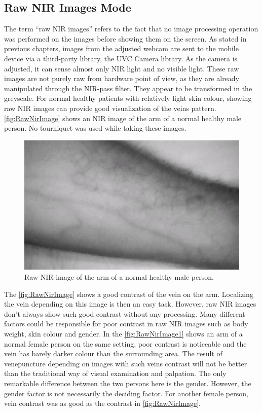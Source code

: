 \subsection{Raw NIR Images Mode}

The term “raw NIR images” refers to the fact that no image processing operation was performed on the images before showing them on the screen. As stated in previous chapters, images from the adjusted webcam are sent to the mobile device via a third-party library, the UVC Camera library. As the camera is adjusted, it can sense almost only NIR light and no visible light. These raw images are not purely raw from hardware point of view, as they are already manipulated through the NIR-pass filter. They appear to be transformed in the greyscale. For normal healthy patients with relatively light skin colour, showing raw NIR images can provide good visualization of the veins pattern. \autoref{fig:RawNirImage} shows an NIR image of the arm of a normal healthy male person. No tourniquet was used while taking these images.


\begin{figure}[H]
\centering
\includegraphics[scale=0.7]{figures/nir.JPG}
\caption[Raw NIR Image of an Arm with Good Vein Contrast]{Raw NIR image of the arm of a normal healthy male person.}\label{fig:RawNirImage}
\end{figure}

The \autoref{fig:RawNirImage} shows a good contrast of the vein on the arm. Localizing the vein depending on this image is then an easy task. However, raw NIR images don’t always show such good contrast without any processing. Many different factors could be responsible for poor contrast in raw NIR images such as body weight, skin colour and gender.  In the \autoref{fig:RawNirImage1}  shows an arm of a normal female person on the same setting, poor contrast is noticeable and the vein has barely darker colour than the surrounding area.
The result of venepuncture depending on images with such veins contrast will not be better than the traditional way of visual examination and palpation. The only remarkable difference between the two persons here is the gender. However, the gender factor is not necessarily the deciding factor. For another female person, vein contrast was as good as the contrast in \autoref{fig:RawNirImage}.

